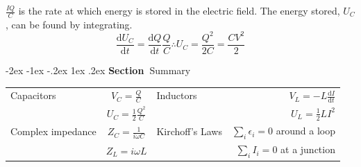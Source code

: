 \documentclass[
]{book}
\makeatletter
\renewcommand\section{%
\@startsection{section}{1}{\z@}%
              {-2ex \@plus -1ex \@minus -.2ex}%
              {1ex \@plus .2ex}%
              {\sffamily\bfseries\large\noindent Section~}}
\numberwithin{equation}{section}
\makeatother
\begin{document}
\(\frac{IQ}{C}\) is the rate at which energy is stored in the electric
field. The energy stored, \(U_C\), can be found by integrating.
\begin{equation}
\label{eq:energyCap}
\frac{\mathrm{d} U_C}{\mathrm{d} t} = \frac{\mathrm{d} Q}{\mathrm{d} t} \frac{Q}{C} \therefore U_C = \frac{Q^2}{2C} = \frac{CV^2}{2}
\end{equation}

\hypertarget{summary-1}{%
\section{Summary}\label{summary-1}}

\protect\hypertarget{tab:summary}{}{}

\begin{longtable}[]{@{}lclr@{}}
\toprule\noalign{}
\endhead
\bottomrule\noalign{}
\endlastfoot
Capacitors & \(V_C = \frac{Q}{C}\) & Inductors & \(V_L = -L \frac{\mathrm{d} I}{\mathrm{d} t}\) \\
& \(U_C = \frac{1}{2} \frac{Q^2}{C}\) & & \(U_L = \frac{1}{2} LI^2\) \\
Complex impedance & \(Z_C = \frac{1}{i \omega C}\) & Kirchoff's Laws & \(\sum_i \epsilon_i = 0\) around a loop \\
& \(Z_L = i \omega L\) & & \(\sum_i I_i = 0\) at a junction \\
\end{longtable}

  
\end{document}
